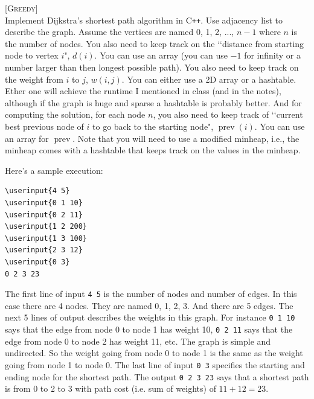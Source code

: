 \textsc{[Greedy]}
\\
Implement Dijkstra's shortest path algorithm in C\texttt{++}.
Use adjacency list to describe the graph.
Assume the vertices are named 0, 1, 2, ..., $n - 1$
where $n$ is the number of nodes.
You also need to keep track on the \lq\lq distance from starting node to
vertex $i$", $d(i)$. You can use an array (you can use
$-1$ for infinity or a number larger than then longest possible path).
You also need to keep track on the weight from $i$ to $j$, $w(i,j)$.
You can either use a 2D array or a hashtable.
Ether one will achieve the runtime I mentioned in class (and in the notes),
although if the graph is huge and sparse a hashtable is probably better.
And for computing the solution, for each node $n$, you
also need to keep track of
\lq\lq current best previous node of $i$ to go back to the starting node",
$\operatorname{prev}(i)$.
You can use an array for $\operatorname{prev}$.
Note that you will need to use a modified minheap, i.e.,
the minheap comes with a hashtable that keeps track on the values in the
minheap.

Here's a sample execution:
\begin{Verbatim}[frame=single,commandchars=\\\{\}]
\userinput{4 5}
\userinput{0 1 10}
\userinput{0 2 11}
\userinput{1 2 200}
\userinput{1 3 100}
\userinput{2 3 12}
\userinput{0 3}
0 2 3 23
\end{Verbatim}
The first line of input \verb!4 5! is the number of nodes and number of edges.
In this case there are 4 nodes. They are named 0, 1, 2, 3.
And there are 5 edges.
The next 5 lines of output describes the weights in this graph.
For instance
\verb!0 1 10! says that the edge from node 0 to node 1 has weight 10,
\verb!0 2 11! says that the edge from node 0 to node 2 has weight 11, etc.
The graph is simple and undirected.
So the weight going from node 0 to node 1 is the same as the weight going from
node 1 to node 0.
The last line of input \verb!0 3! specifies the starting and ending node
for the shortest path.
The output
\verb!0 2 3 23! says that a shortest path is from 0 to 2 to 3
with path cost (i.e. sum of weights) of  $11 + 12 = 23$.
